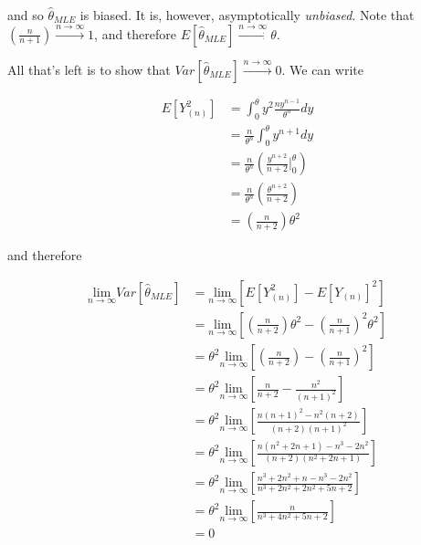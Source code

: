\documentclass[
  letterpaper,
  DIV=11,
  numbers=noendperiod]{scrreprt}
\begin{document}
and so \(\hat{\theta}_{MLE}\) is biased. It is, however, asymptotically
\emph{unbiased}. Note that
\(\left( \frac{n}{n + 1} \right) \overset{n \to \infty}{\to} 1\), and
therefore
\(E\left[\hat{\theta}_{MLE}\right] \overset{n \to \infty}{\to} \theta\).

All that's left is to show that
\(Var\left[\hat{\theta}_{MLE}\right] \overset{n \to \infty}{\to} 0\). We
can write

\begin{align*}
        E\left[Y_{(n)}^2\right] & = \int_0^\theta y^2 \frac{ny^{n-1}}{\theta^n} dy \\
        & = \frac{n}{\theta^n} \int_0^\theta y^{n + 1} dy \\
        & = \frac{n}{\theta^n} \left( \frac{y^{n + 2}}{n + 2} \bigg|_0^\theta \right) \\
        & = \frac{n}{\theta^n} \left( \frac{\theta^{n + 2}}{n + 2}\right) \\
        & = \left( \frac{n}{n + 2} \right) \theta^2
    \end{align*}

and therefore

\begin{align*}
    \underset{n \to \infty}{\text{lim}} Var\left[\hat{\theta}_{MLE}\right] & = \underset{n \to \infty}{\text{lim}} \left[ E\left[Y_{(n)}^2\right] - E\left[Y_{(n)}\right]^2 \right]\\
    & = \underset{n \to \infty}{\text{lim}} \left[ \left( \frac{n}{n + 2} \right) \theta^2 - \left( \frac{n}{n + 1} \right)^2 \theta^2 \right] \\
    & = \theta^2 \underset{n \to \infty}{\text{lim}} \left[ \left( \frac{n}{n + 2} \right)  - \left( \frac{n}{n + 1} \right)^2\right] \\
    & = \theta^2 \underset{n \to \infty}{\text{lim}} \left[  \frac{n}{n + 2}   - \frac{n^2}{(n + 1)^2} \right] \\
    & = \theta^2 \underset{n \to \infty}{\text{lim}} \left[  \frac{n(n + 1)^2 - n^2 (n + 2)}{(n + 2)(n + 1)^2} \right] \\
    & = \theta^2 \underset{n \to \infty}{\text{lim}} \left[  \frac{n(n^2 + 2n + 1) - n^3 -2n^2}{(n + 2)(n^2 + 2n + 1)} \right] \\
    & = \theta^2 \underset{n \to \infty}{\text{lim}} \left[  \frac{n^3 + 2n^2 + n - n^3 -2n^2}{n^3 + 2n^2 + 2n^2 + 5n + 2} \right] \\
    & = \theta^2 \underset{n \to \infty}{\text{lim}} \left[  \frac{n}{n^3 + 4n^2  + 5n + 2} \right] \\
    & = 0
\end{align*}
\end{document}
